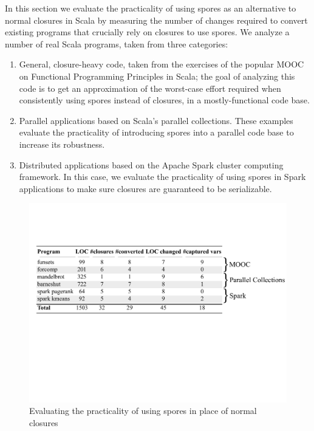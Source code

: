 \documentclass{llncs}
\begin{document}




In this section we evaluate the practicality of using spores as an alternative to normal closures in Scala by measuring the number of changes required to convert existing programs that crucially rely on closures to use spores. We analyze a number of real Scala programs, taken from three categories:
\begin{enumerate}
\vspace{-1mm}
\item General, closure-heavy code, taken from the exercises of the popular MOOC on Functional Programming Principles in Scala; the goal of analyzing this code is to get an approximation of the worst-case effort required when consistently using spores instead of closures, in a mostly-functional code base.

\item Parallel applications based on Scala's parallel collections. These examples evaluate the practicality of introducing spores into a parallel code base to increase its robustness.

\item Distributed applications based on the Apache Spark cluster computing framework. In this case, we evaluate the practicality of using spores in Spark applications to make sure closures are guaranteed to be serializable.
\vspace{-2mm}
\end{enumerate}

\begin{figure}[t!]
\centering
\includegraphics[width=\textwidth]{evaluation.pdf}
\caption{Evaluating the practicality of using spores in place of normal closures}
\label{fig:spore-eval}
\vspace{-5mm}
\end{figure}
\end{document}
